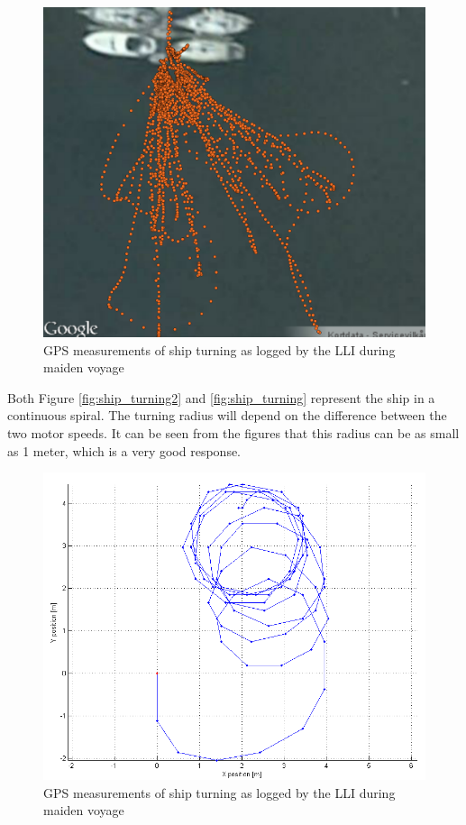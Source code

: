 \begin{figure}[htbp]
	\begin{center}
		\includegraphics[width=\textwidth]{img/maidenVoyage/pointsOnMapZoom}
		\caption{GPS measurements of ship turning as logged by the LLI during maiden voyage} 
		\label{fig:pointsOnMap2}
	\end{center}
\end{figure}

Both Figure \vref{fig:ship_turning2} and \vref{fig:ship_turning} represent the ship in a continuous spiral. The turning radius will depend on the difference between the two motor speeds. It can be seen from the figures that this radius can be as small as 1 meter, which is a very good response.

\begin{figure}[htbp]
	\begin{center}
		\includegraphics[width=\textwidth]{img/maidenVoyage/ship_turning2}
		\caption{GPS measurements of ship turning as logged by the LLI during maiden voyage} 
		\label{fig:ship_turning2}
	\end{center}
\end{figure}

